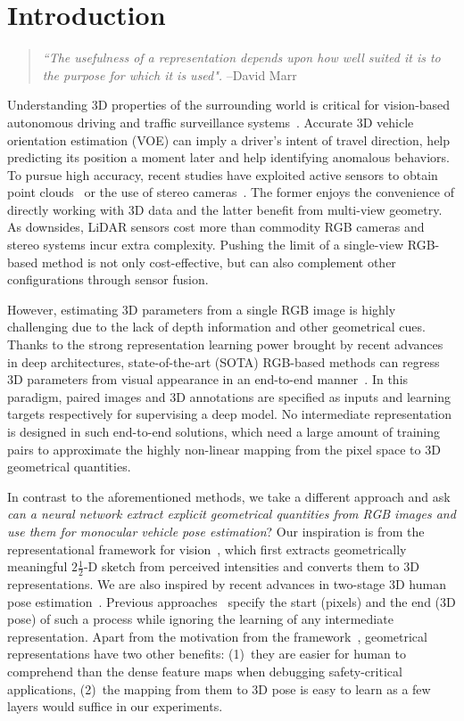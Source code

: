 \documentclass[final]{cvpr}
\begin{document}
\section{Introduction}
\begin{quote}
\textit{``The usefulness of a representation depends upon how well suited it is to the purpose for which it is used".}
\hfill
--David Marr~\cite{marr2010vision}
\end{quote}
Understanding 3D properties of the surrounding world is critical for vision-based autonomous driving and traffic surveillance systems~\cite{ferryman2000visual}. Accurate 3D vehicle orientation estimation (VOE) can imply a driver's intent of travel direction, help predicting its position a moment later and help identifying anomalous behaviors. To pursue high accuracy, recent studies have exploited active sensors to obtain point clouds~\cite{yang2018pixor, zhou2018voxelnet, qi2019deep} or the use of stereo cameras~\cite{li2018stereo, sun2020disp, peng2020ida}. The former enjoys the convenience of directly working with 3D data and the latter benefit from multi-view geometry. As downsides, LiDAR sensors cost more than commodity RGB cameras and stereo systems incur extra complexity. Pushing the limit of a single-view RGB-based method is not only cost-effective, but can also complement other configurations through sensor fusion.  

However, estimating 3D parameters from a single RGB image is highly challenging due to the lack of depth information and other geometrical cues. Thanks to the strong representation learning power brought by recent advances in deep architectures, state-of-the-art (SOTA) RGB-based methods can regress 3D parameters from visual appearance in an end-to-end manner~\cite{mousavian20173d, brazil2019m3d, simonelli2019disentangling}. In this paradigm, paired images and 3D annotations are specified as inputs and learning targets respectively for supervising a deep model. No intermediate representation is designed in such end-to-end solutions, which need a large amount of training pairs to approximate the highly non-linear mapping from the pixel space to 3D geometrical quantities.

In contrast to the aforementioned methods, we take a different approach and ask \emph{can a neural network extract explicit geometrical quantities from RGB images and use them for monocular vehicle pose estimation}? Our inspiration is from the representational framework for vision~\cite{marr2010vision}, which first extracts geometrically meaningful $2\frac{1}{2}$-D sketch from perceived intensities and converts them to 3D representations. We are also inspired by recent advances in two-stage 3D human pose estimation~\cite{li2020cascaded}. Previous approaches~\cite{mousavian20173d, brazil2019m3d, simonelli2019disentangling} specify the start (pixels) and the end (3D pose) of such a process while ignoring the learning of any intermediate representation. Apart from the motivation from the framework~\cite{marr2010vision}, geometrical representations have two other benefits: (1)~they are easier for human to comprehend than the dense feature maps when debugging safety-critical applications, (2)~the mapping from them to 3D pose is easy to learn as a few layers would suffice in our experiments.   
\end{document}
